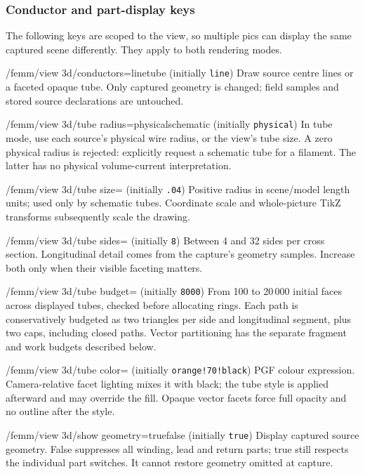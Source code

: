 \subsubsection{Conductor and part-display keys}
The following keys are scoped to the view, so multiple pics can display the
same captured scene differently. They apply to both rendering modes.
\begin{key}{/femm/view 3d/conductors=line\textbar tube (initially \texttt{line})}
Draw source centre lines or a faceted opaque tube. Only captured geometry is
changed; field samples and stored source declarations are untouched.
\end{key}
\begin{key}{/femm/view 3d/tube radius=physical\textbar schematic (initially \texttt{physical})}
In tube mode, use each source's physical wire radius, or the view's tube size.
A zero physical radius is rejected: explicitly request a schematic tube for
a filament. The latter has no physical volume-current interpretation.
\end{key}
\begin{key}{/femm/view 3d/tube size= (initially \texttt{.04})}
Positive radius in scene/model length units; used only by schematic tubes.
Coordinate scale and whole-picture TikZ transforms subsequently scale the drawing.
\end{key}
\begin{key}{/femm/view 3d/tube sides= (initially \texttt{8})}
Between 4 and 32 sides per cross section. Longitudinal detail comes from the
capture's geometry samples. Increase both only when their visible faceting matters.
\end{key}
\begin{key}{/femm/view 3d/tube budget= (initially \texttt{8000})}
From 100 to 20\,000 initial faces across displayed tubes, checked before allocating
rings. Each path is conservatively budgeted as two triangles per side and
longitudinal segment, plus two caps, including closed paths. Vector partitioning
has the separate fragment and work budgets described below.
\end{key}
\begin{key}{/femm/view 3d/tube color= (initially \texttt{orange!70!black})}
PGF colour expression. Camera-relative facet lighting mixes it with black;
the tube style is applied afterward and may override the fill. Opaque vector
facets force full opacity and no outline after the style.
\end{key}
\begin{key}{/femm/view 3d/show geometry=true\textbar false (initially \texttt{true})}
Display captured source geometry. False suppresses all winding, lead and return
parts; true still respects the individual part switches. It cannot restore
geometry omitted at capture.
\end{key}
